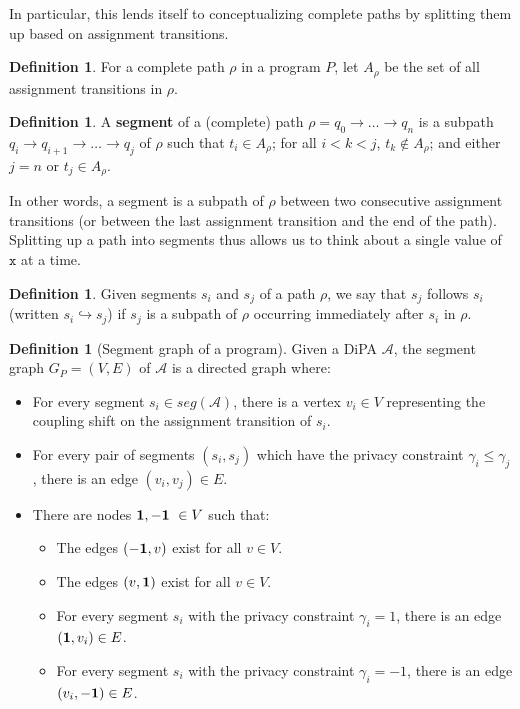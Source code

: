 \documentclass[12pt]{article}
\theoremstyle{definition}
\newtheorem{defn}[thm]{Definition}
\begin{document}
In particular, this lends itself to conceptualizing complete paths by splitting them up based on assignment transitions. 

\begin{defn}
    For a complete path $\rho$ in a program $P$, let $A_\rho$ be the set of all assignment transitions in $\rho$. 
\end{defn}

\begin{defn}
    A \textbf{segment} of a (complete) path $\rho = q_0\to\ldots\to q_n$ is a subpath $q_i \to q_{i+1}\to \ldots \to q_j$ of $\rho$ such that $t_i \in A_\rho$; for all $i<k<j$, $t_k \notin A_\rho$; and either $j=n$ or $t_j \in A_\rho$.
\end{defn}

In other words, a segment is a subpath of $\rho$ between two consecutive assignment transitions (or between the last assignment transition and the end of the path). Splitting up a path into segments thus allows us to think about a single value of $\texttt{x}$ at a time.



\begin{defn}
    Given segments $s_i$ and $s_j$ of a path $\rho$, we say that $s_j$ follows $s_i$ (written $s_i \hookrightarrow s_j$) if $s_j$ is a subpath of $\rho$ occurring immediately after $s_i$ in $\rho$.
\end{defn}


\begin{defn}[Segment graph of a program]
    Given a DiPA $\mathcal{A}$, the segment graph $G_P = (V, E)$ of $\mathcal{A}$ is a directed graph where: 
    \begin{itemize}
        \item For every segment $s_i \in seg(\mathcal{A})$, there is a vertex $v_i \in V$ representing the coupling shift on the assignment transition of $s_i$.
        \item For every pair of segments $(s_i, s_j)$ which have the privacy constraint $\gamma_i \leq \gamma_j$, there is an edge $(v_i, v_j) \in E$.
        \item There are nodes ${\bf 1, -1}\ \in V$ such that: 
        \begin{itemize}
            \item The edges $({\bf -1}, v)$ exist for all $v \in V$.
            \item The edges $(v, {\bf 1})$ exist for all $v \in V$.
            \item For every segment $s_i$ with the privacy constraint $\gamma_i = 1$, there is an edge $({\bf 1}, v_i) \in E$.
            \item For every segment $s_i$ with the privacy constraint $\gamma_i = -1$, there is an edge $(v_i, {\bf -1}) \in E$. 
        \end{itemize}
    \end{itemize}
\end{defn}
\end{document}
